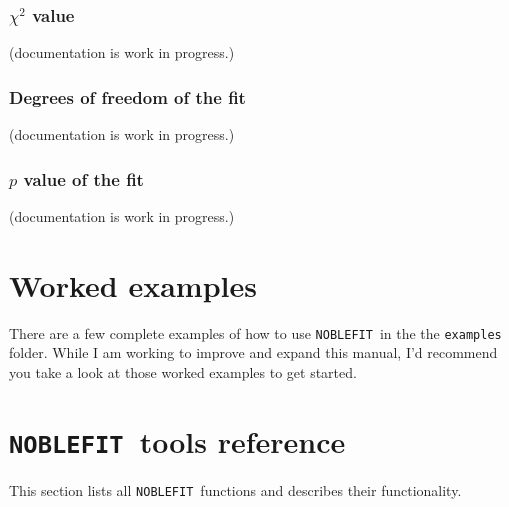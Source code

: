 \documentclass[12pt]{article}
\newcommand{\noblefit}{{\tt NOBLEFIT}}
\begin{document}
\subsubsection{$\chi^2$ value}
(documentation is work in progress.)

\subsubsection{Degrees of freedom of the fit}
(documentation is work in progress.)

\subsubsection{$p$ value of the fit}
(documentation is work in progress.)

\section{Worked examples}
There are a few complete examples of how to use \noblefit\ in the the {\tt examples} folder. While I am working to improve and expand this manual, I'd recommend you take a look at those worked examples to get started.


\section{\noblefit\  tools reference}\label{sec:tools_ref}
This section lists all \noblefit\ functions and describes their functionality.





\end{document}

